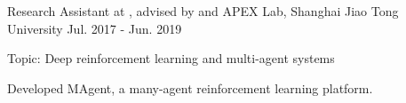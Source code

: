 \begin{cventries}

\cventry
    {Research Assistant at , advised by  and } %
    {APEX Lab, Shanghai Jiao Tong University} %
    {Jul. 2017 - Jun. 2019} %
    {} %
	{
		\begin{cvitems} %
			\item{Topic: Deep reinforcement learning and multi-agent systems}
			\item{Developed MAgent, a many-agent reinforcement learning platform.}
		\end{cvitems}
	}

\end{cventries}
